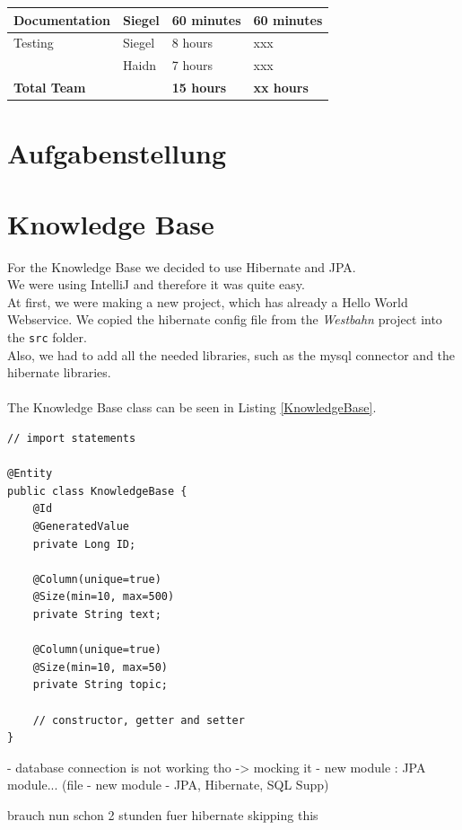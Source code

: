 \documentclass[12pt]{article}
\begin{document}
\begin{table}[h]
\begin{tabular}{|p{}|p{}|p{}|p{}|}
Documentation  & Siegel &  60 minutes  &  60 minutes  \\ \hline 
\hline 

Testing & Siegel &  8 hours  & xxx   \\  
  & Haidn &  7 hours   & xxx   \\ \hline 


 \hline 
\textbf{Total Team} & & \textbf{15 hours} &\textbf{xx hours}  \\ \hline 
\end{tabular}
\end{table}

\section{Aufgabenstellung}

\section{Knowledge Base}
For the Knowledge Base we decided to use Hibernate and JPA. \\
We were using IntelliJ and therefore it was quite easy. \\
At first, we were making a new project, which has already a Hello World Webservice. We copied the hibernate config file from the \textit{Westbahn} project into the \texttt{src} folder.\\
Also, we had to add all the needed libraries, such as the mysql connector and the hibernate libraries.\\
\\
The Knowledge Base class can be seen in Listing \ref{KnowledgeBase}.
\begin{lstlisting}[caption=KnowledgeBase entity class, label=KnowledgeBase]
// import statements

@Entity
public class KnowledgeBase {
    @Id
    @GeneratedValue
    private Long ID;

    @Column(unique=true)
    @Size(min=10, max=500)
    private String text;

    @Column(unique=true)
    @Size(min=10, max=50)
    private String topic;

	// constructor, getter and setter
}
\end{lstlisting}

- database connection is not working tho
-> mocking it
- new module : JPA module... (file - new module - JPA, Hibernate, SQL Supp)


brauch nun schon 2 stunden fuer hibernate
skipping this
\end{document}
